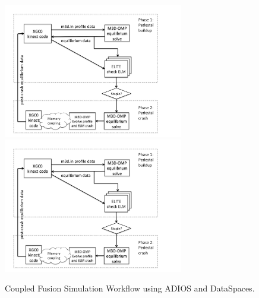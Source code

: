 \begin{figure}[h!]
\centering
\myIfColor
{
\includegraphics[width=0.7\textwidth]{Chapters/part3-ch5-adios/figs/coupling.png}
}
{
\includegraphics[width=0.7\textwidth]{Chapters/part3-ch5-adios/figs/coupling.png}
}
\caption[]
{Coupled Fusion Simulation Workflow using ADIOS and DataSpaces.
}
\label{part3-ch5-adios:fig:coupling}
\end{figure}